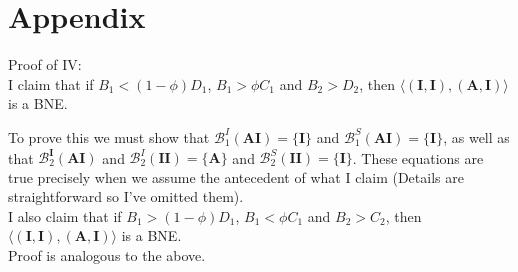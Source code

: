 \documentclass{article}
\theoremstyle{definition}
\theoremstyle{exercise}
\theoremstyle{remark}
\begin{document}
\newpage
\section{Appendix}%
%
Proof of IV:\\
I claim that if $ B_1 < (1 - \phi)D_1$, $ B_1 > \phi C_1$ and $ B_2 > D_2$, then $ \langle (\bm{I}, \bm{I}), (\bm{A}, \bm{I}) \rangle$ is a BNE.

To prove this we must show that $ \mathcal{B}_1^{I}(\bm{AI}) = \{\bm{I}\} $ and $ \mathcal{B}_1^{S}(\bm{AI}) = \{\bm{I}\}$, as well as that $\mathcal{B}_2^{\bm{I}}(\bm{AI})$ and $\mathcal{B}_2^{I}(\bm{II}) = \{\bm{A}\}$ and $\mathcal{B}_2^{S}(\bm{II}) = \{\bm{I}\}$.
These equations are true precisely when we assume the antecedent of what I claim (Details are straightforward so I've omitted them).\\

I also claim that if $ B_1 > (1 - \phi)D_1$, $ B_1 < \phi C_1$ and $ B_2 > C_2$, then $ \langle (\bm{I}, \bm{I}), (\bm{A}, \bm{I}) \rangle$ is a BNE.\\
Proof is analogous to the above.
%
\\\\
%
%
\end{document}
